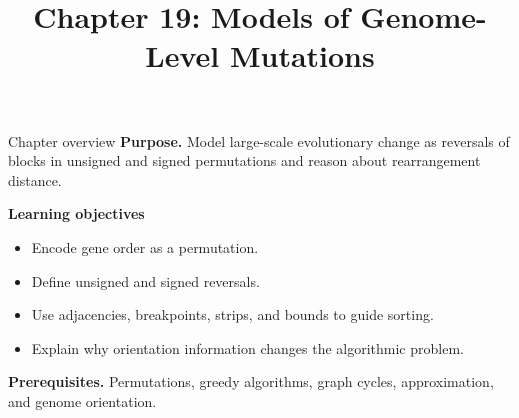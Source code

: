 \documentclass[11pt,letterpaper]{article}
\title{Chapter 19: Models of Genome-Level Mutations}
\author{}
\date{}
\begin{document}
\maketitle

\begin{CornellOverviewBox}{Chapter overview}
\textbf{Purpose.} Model large-scale evolutionary change as reversals of blocks in unsigned and signed permutations and reason about rearrangement distance.

\textbf{Learning objectives}
\begin{itemize}
  \item Encode gene order as a permutation.
  \item Define unsigned and signed reversals.
  \item Use adjacencies, breakpoints, strips, and bounds to guide sorting.
  \item Explain why orientation information changes the algorithmic problem.
\end{itemize}

\textbf{Prerequisites.} Permutations, greedy algorithms, graph cycles, approximation, and genome orientation.
\end{CornellOverviewBox}
\end{document}
